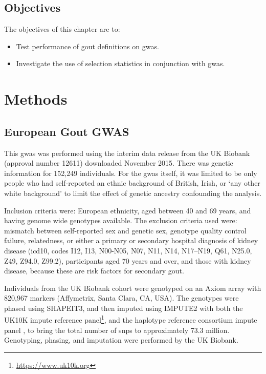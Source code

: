 \documentclass[]{report}
\providecommand{\tightlist}{%
  \setlength{\itemsep}{0pt}\setlength{\parskip}{0pt}}
\begin{document}
\subsection{Objectives}\label{objectives-2}

The objectives of this chapter are to:

\begin{itemize}
\tightlist
\item
  Test performance of gout definitions on \gls{gwas}.
\item
  Investigate the use of selection statistics in conjunction with
  \gls{gwas}.
\end{itemize}

\section{Methods}\label{methods-2}

\subsection{European Gout GWAS}\label{ukbbgwas}

This \gls{gwas} was performed using the interim data release from the UK
Biobank (approval number 12611) downloaded November 2015. There was
genetic information for 152,249 individuals. For the \gls{gwas} itself,
it was limited to be only people who had self-reported an ethnic
background of British, Irish, or `any other white background' to limit
the effect of genetic ancestry confounding the analysis.

Inclusion criteria were: European ethnicity, aged between 40 and 69
years, and having genome wide genotypes available. The exclusion
criteria used were: mismatch between self-reported sex and genetic sex,
genotype quality control failure, relatedness, or either a primary or
secondary hospital diagnosis of kidney disease (\gls{icd10}, codes I12,
I13, N00-N05, N07, N11, N14, N17--N19, Q61, N25.0, Z49, Z94.0, Z99.2),
participants aged 70 years and over, and those with kidney disease,
because these are risk factors for secondary gout.

Individuals from the UK Biobank cohort were genotyped on an Axiom array
with 820,967 markers (Affymetrix, Santa Clara, CA, USA). The genotypes
were phased using SHAPEIT3, and then imputed using IMPUTE2 with both the
UK10K impute reference panel\footnote{\url{https://www.uk10k.org}}, and
the haplotype reference consortium impute panel \citep{McCarthy2016}, to
bring the total number of \glspl{snp} to approximately 73.3 million.
Genotyping, phasing, and imputation were performed by the UK Biobank.
\end{document}
